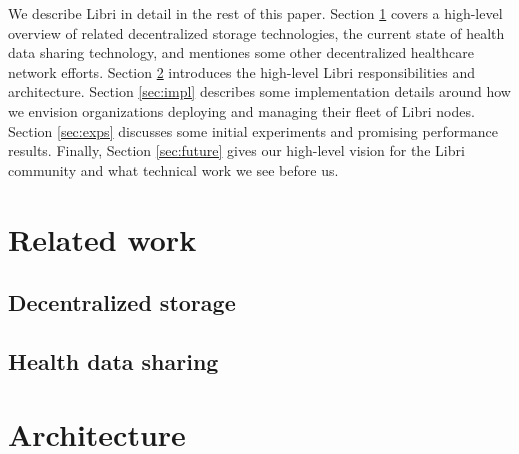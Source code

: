 \documentclass[10pt]{article}
\begin{document}
We describe Libri in detail in the rest of this paper. Section \ref{sec:related} covers a high-level overview of related decentralized storage technologies, the current state of health data sharing technology, and mentiones some other decentralized healthcare network efforts. Section \ref{sec:arch} introduces the high-level Libri responsibilities and architecture. Section \ref{sec:impl} describes some implementation details around how we envision organizations deploying and managing their fleet of Libri nodes. Section \ref{sec:exps} discusses some initial experiments and promising performance results. Finally, Section \ref{sec:future} gives our high-level vision for the Libri community and what technical work we see before us.

\section{Related work}
\label{sec:related}

\subsection{Decentralized storage}

\subsection{Health data sharing}

\section{Architecture}
\label{sec:arch}
\end{document}
